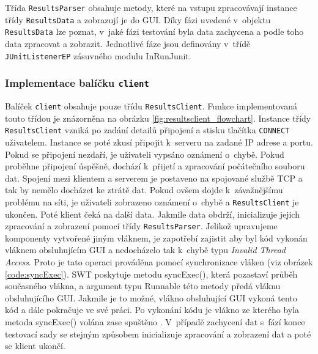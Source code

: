

      Třída \texttt{ResultsParser} obsahuje metody, které na vstupu zpracovávají instance třídy \texttt{ResultsData} a zobrazují je do GUI. Díky fázi uvedené v~objektu \texttt{ResultsData} lze poznat, v~jaké fázi testování byla data zachycena a podle toho data zpracovat a zobrazit. Jednotlivé fáze jsou definovány v~třídě \texttt{JUnitListenerEP} zásuvného modulu InRunJunit.
      

      \subsubsection{Implementace balíčku \texttt{client}}
      Balíček \texttt{client} obsahuje pouze třídu \texttt{ResultsClient}. Funkce implementovaná touto třídou je znázorněna na obrázku \ref{fig:resultsclient_flowchart}. Instance třídy \texttt{ResultsClient} vzniká po zadání detailů připojení a stisku tlačítka \texttt{CONNECT} uživatelem. Instance se poté zkusí připojit k~serveru na zadané IP adrese a portu. Pokud se připojení nezdaří, je uživateli vypsáno oznámení o~chybě. Pokud proběhne připojení úspěšně, dochází k~přijetí a zpracování počátečního souboru dat. Spojení mezi klientem a serverem je postaveno na spojované službě TCP a tak by nemělo docházet ke ztrátě dat. Pokud ovšem dojde k~závažnějšímu problému na síti, je uživateli zobrazeno oznámení o~chybě a \texttt{ResultsClient} je ukončen. Poté klient čeká na další data. Jakmile data obdrží, inicializuje jejich zpracování a zobrazení pomocí třídy \texttt{ResultsParser}. Jelikož upravujeme komponenty vytvořené jiným vláknem, je zapotřebí zajistit aby byl kód vykonán vláknem obsluhujícím GUI a nedocházelo tak k~chybě typu \emph{Invalid Thread Access}. Proto je tato operaci prováděna pomocí synchronizace vláken (viz obrázek \ref{code:syncExec}). SWT poskytuje metodu syncExec(), která pozastaví průběh současného vlákna, a argument typu Runnable této metody předá vláknu obsluhujícího GUI. Jakmile je to možné, vlákno obsluhující GUI vykoná tento kód a dále pokračuje ve své práci. Po vykonání kódu je vlákno ze kterého byla metoda syncExec() volána zase spuštěno \cite{codeaffine-asyncexec}. V~případě zachycení dat s~fází konce testovací sady se stejným způsobem inicializuje zpracování a zobrazení dat a poté se klient ukončí.
      
